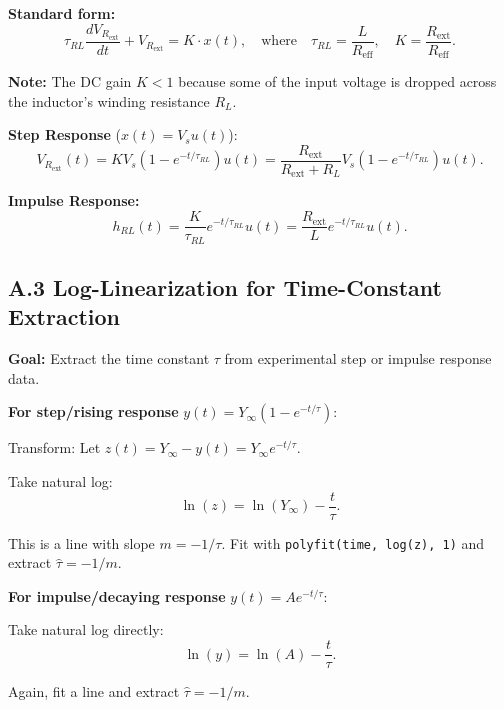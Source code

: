 \documentclass[11pt,letterpaper]{article}
\begin{document}
\noindent
\textbf{Standard form:}
\begin{equation}
\tau_{RL} \frac{dV_{R_{\text{ext}}}}{dt} + V_{R_{\text{ext}}} = K \cdot x(t), \quad \text{where} \quad \tau_{RL} = \frac{L}{R_{\text{eff}}}, \quad K = \frac{R_{\text{ext}}}{R_{\text{eff}}}.
\end{equation}

\noindent
\textbf{Note:} The DC gain $K < 1$ because some of the input voltage is dropped across the inductor's winding resistance $R_L$.

\noindent
\textbf{Step Response} ($x(t) = V_s u(t)$):
\begin{equation}
V_{R_{\text{ext}}}(t) = K V_s \left(1 - e^{-t/\tau_{RL}}\right) u(t) = \frac{R_{\text{ext}}}{R_{\text{ext}} + R_L} V_s \left(1 - e^{-t/\tau_{RL}}\right) u(t).
\end{equation}

\noindent
\textbf{Impulse Response:}
\begin{equation}
h_{RL}(t) = \frac{K}{\tau_{RL}} e^{-t/\tau_{RL}} u(t) = \frac{R_{\text{ext}}}{L} e^{-t/\tau_{RL}} u(t).
\end{equation}

\subsection*{A.3 Log-Linearization for Time-Constant Extraction}

\textbf{Goal:} Extract the time constant $\tau$ from experimental step or impulse response data.

\noindent
\textbf{For step/rising response} $y(t) = Y_\infty (1 - e^{-t/\tau})$:

Transform: Let $z(t) = Y_\infty - y(t) = Y_\infty e^{-t/\tau}$.

\noindent
Take natural log:
\begin{equation}
\ln(z) = \ln(Y_\infty) - \frac{t}{\tau}.
\end{equation}

\noindent
This is a line with slope $m = -1/\tau$. Fit with \texttt{polyfit(time, log(z), 1)} and extract $\hat{\tau} = -1/m$.

\noindent
\textbf{For impulse/decaying response} $y(t) = A e^{-t/\tau}$:

Take natural log directly:
\begin{equation}
\ln(y) = \ln(A) - \frac{t}{\tau}.
\end{equation}

\noindent
Again, fit a line and extract $\hat{\tau} = -1/m$.
\end{document}

